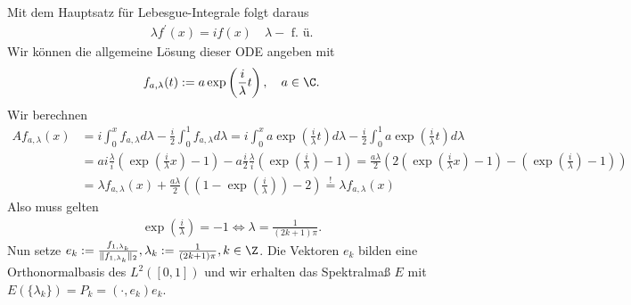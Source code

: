 \begin{solution}
Mit dem Hauptsatz für Lebesgue-Integrale folgt daraus
\begin{align*}
  \lambda f^{\prime}(x) = if(x) \quad \lambda- \text{ f. ü.}
\end{align*}
Wir können die allgemeine Lösung dieser ODE angeben mit
\begin{align*}
  f_{a,\lambda}(t) := a\exp\left(\frac{i}{\lambda}t\right), \quad a \in \C.
\end{align*}
Wir berechnen
\begin{align*}
  A f_{a,\lambda}(x) &=
  i \int_0^x f_{a,\lambda} d\lambda - \frac{i}{2}\int_0^1 f_{a,\lambda} d\lambda =
  i \int_0^x a\exp\left(\frac{i}{\lambda}t\right) d\lambda -
  \frac{i}{2}\int_0^1 a\exp\left(\frac{i}{\lambda}t\right) d\lambda \\
  &= ai \frac{\lambda}{i}\left(\exp\left(\frac{i}{\lambda}x\right) - 1\right)
  - a\frac{i}{2}\frac{\lambda}{i}\left(\exp\left(\frac{i}{\lambda}\right) - 1\right)
  = \frac{a\lambda}{2}\left(2\left(\exp\left(\frac{i}{\lambda}x\right) - 1\right)
  - \left(\exp\left(\frac{i}{\lambda}\right) - 1\right)\right) \\
  &= \lambda f_{a,\lambda}(x) + \frac{a\lambda}{2}
  \left(\left(1 - \exp\left(\frac{i}{\lambda}\right)\right) -  2\right)
  \stackrel{!}{=} \lambda f_{a,\lambda}(x)
\end{align*}
Also muss gelten
\begin{align*}
  \exp\left(\frac{i}{\lambda}\right) = -1 \iff \lambda = \frac{1}{(2k+1)\pi}.
\end{align*}
Nun setze $e_k := \frac{f_{1,\lambda_k}}{\|f_{1,\lambda_k}\|_2},
\lambda_k := \frac{1}{(2k+1)\pi}, k \in \Z$.
Die Vektoren $e_k$ bilden eine Orthonormalbasis des $L^2([0,1])$ und wir erhalten
das Spektralmaß $E$ mit $E(\{\lambda_k\}) = P_k = (\cdot,e_k)e_k$.
\end{solution}
